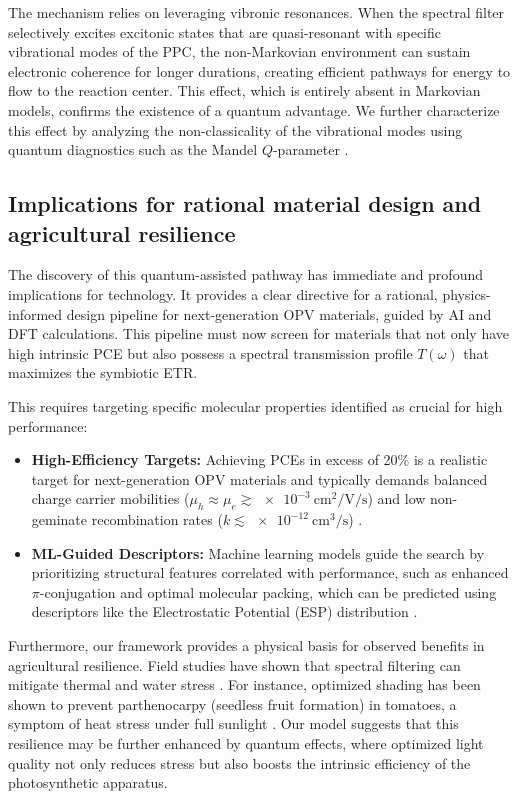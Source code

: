 \documentclass[aps,prb,onecolumn,superscriptaddress,notitlepage,nofootinbib,longbibliography,10pt]{revtex4-2}
\begin{document}
The mechanism relies on leveraging vibronic resonances. When the spectral filter selectively excites excitonic states that are quasi-resonant with specific vibrational modes of the PPC, the non-Markovian environment can sustain electronic coherence for longer durations, creating efficient pathways for energy to flow to the reaction center. This effect, which is entirely absent in Markovian models, confirms the existence of a quantum advantage. We further characterize this effect by analyzing the non-classicality of the vibrational modes using quantum diagnostics such as the Mandel $Q$-parameter \cite{oreilly2014}.

\subsection{Implications for rational material design and agricultural resilience}\label{sec:Rat-Mat-Desig}

The discovery of this quantum-assisted pathway has immediate and profound implications for technology. It provides a clear directive for a rational, physics-informed design pipeline for next-generation OPV materials, guided by AI and DFT calculations. This pipeline must now screen for materials that not only have high intrinsic PCE but also possess a spectral transmission profile $T(\omega)$ that maximizes the symbiotic ETR.

This requires targeting specific molecular properties identified as crucial for high performance:
\begin{itemize}
    \item \textbf{High-Efficiency Targets:} Achieving PCEs in excess of 20\% is a realistic target for next-generation OPV materials and typically demands balanced charge carrier mobilities ($\mu_h \approx \mu_e \gtrsim \SI{e-3}{\centi\meter\squared\per\volt\per\second}$) and low non-geminate recombination rates ($k \lesssim \SI{e-12}{\centi\meter\cubed\per\second}$) \cite{firdaus2019, zhang2021a}.
    \item \textbf{ML-Guided Descriptors:} Machine learning models guide the search by prioritizing structural features correlated with performance, such as enhanced $\pi$-conjugation and optimal molecular packing, which can be predicted using descriptors like the Electrostatic Potential (ESP) distribution \cite{liu2022, zhang2022_NFA}.
\end{itemize}

Furthermore, our framework provides a physical basis for observed benefits in agricultural resilience. Field studies have shown that spectral filtering can mitigate thermal and water stress \cite{Adeyemi2025}. For instance, optimized shading has been shown to prevent parthenocarpy (seedless fruit formation) in tomatoes, a symptom of heat stress under full sunlight \cite{Scarano2024}. Our model suggests that this resilience may be further enhanced by quantum effects, where optimized light quality not only reduces stress but also boosts the intrinsic efficiency of the photosynthetic apparatus.
\end{document}
